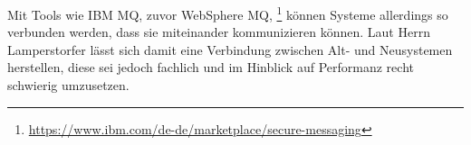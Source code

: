 Mit Tools wie IBM MQ, zuvor WebSphere MQ, \footnote{\url{https://www.ibm.com/de-de/marketplace/secure-messaging}} können Systeme allerdings so verbunden werden, dass sie miteinander kommunizieren können. Laut Herrn Lamperstorfer lässt sich damit  eine Verbindung zwischen Alt- und Neusystemen herstellen, diese sei jedoch fachlich und im Hinblick auf Performanz recht schwierig umzusetzen.




